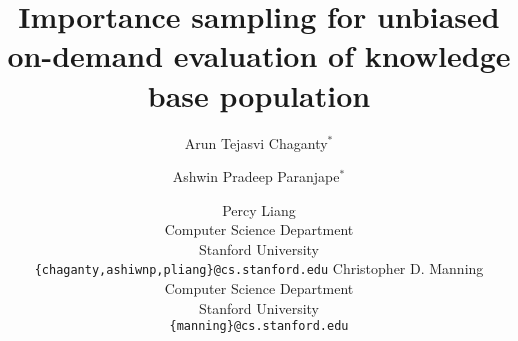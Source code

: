 \documentclass[11pt,letterpaper]{article}
\title{Importance sampling for unbiased on-demand evaluation of knowledge base population}
\author{%
  Arun Tejasvi Chaganty$^*$
\and%
  Ashwin Pradeep Paranjape$^*$
\and%
  Percy Liang
  \\
  Computer Science Department \\
  Stanford University \\
  {\tt \{chaganty,ashiwnp,pliang\}@cs.stanford.edu}
\AND%
  Christopher D. Manning \\
  Computer Science Department \\
  Stanford University \\
  {\tt \{manning\}@cs.stanford.edu}
}
\date{}
\begin{document}
\maketitle

\begin{abstract}

\end{abstract}














\appendix


\end{document}

